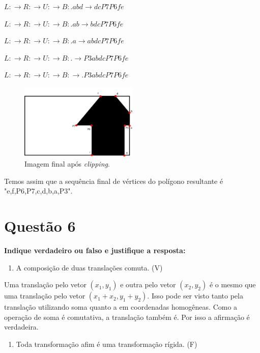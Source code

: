 \documentclass[12pt]{article}
\begin{document}
$L: \xrightarrow{} R: \xrightarrow{} U: \xrightarrow{} B: .abd \xrightarrow{} dcP7P6fe$

$L: \xrightarrow{} R: \xrightarrow{} U: \xrightarrow{} B: .ab \xrightarrow{} bdcP7P6fe$

$L: \xrightarrow{} R: \xrightarrow{} U: \xrightarrow{} B: .a \xrightarrow{} abdcP7P6fe$

$L: \xrightarrow{} R: \xrightarrow{} U: \xrightarrow{} B: . \xrightarrow{} P3abdcP7P6fe$

$L: \xrightarrow{} R: \xrightarrow{} U: \xrightarrow{} B: \xrightarrow{} .P3abdcP7P6fe$

\begin{figure}[H]
    \centering
    \includegraphics[width=0.5\textwidth]{images/5/5final.png}
    \caption*{Imagem final após \textit{clipping}.}
\end{figure}{}

Temos assim que a sequência final de vértices do polígono resultante é "e,f,P6,P7,c,d,b,a,P3".

\section*{Questão 6}
{\bfseries Indique verdadeiro ou falso e justifique a resposta:}

\begin{enumerate}[label=\alph*)]
    \item A composição de duas translações comuta. (V)
\end{enumerate}

Uma translação pelo vetor $(x_1, y_1)$ e outra pelo vetor $(x_2, y_2)$ é o mesmo que uma translação pelo vetor $(x_1+x_2, y_1+y_2)$. Isso pode ser visto tanto pela translação utilizando soma quanto a em coordenadas homogêneas. Como a operação de soma é comutativa, a translação também é. Por isso a afirmação é verdadeira.

\begin{enumerate}[label=\alph*), resume]
    \item Toda transformação afim é uma transformação rígida. (F)
\end{enumerate}
\end{document}
